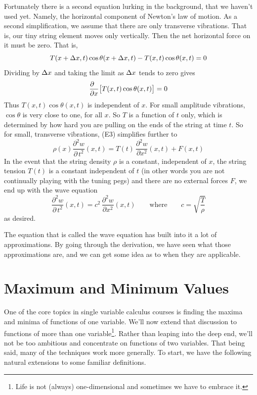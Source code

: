 Fortunately there is a second
equation lurking in the background, that we haven't used yet. Namely, the 
horizontal component of Newton's law of motion. As a second simplification,
we assume that there are only transverse vibrations. That is, our tiny 
string element moves only vertically. Then the net horizontal force on 
it must be zero. That is,
\begin{equation*}
T(x+\Delta x,t)\cos\theta(x+\Delta x,t)-T(x,t)\cos\theta(x,t)=0
\end{equation*}
Dividing by $\Delta x$ and taking the limit as $\Delta x$ tends to zero gives
\begin{equation*}
\frac{\partial \hfill}{\partial x}\big[T(x,t)\cos\theta(x,t)\big]=0
\end{equation*}
Thus $T(x,t)\cos\theta(x,t)$ is independent of $x$.
For small amplitude vibrations, $\cos\theta$ is very close to one, for all
$x$. So $T$ is a function of $t$ only, which is determined by how hard you are
pulling on the ends of the string at time $t$. So for small, transverse
vibrations, (E3) simplifies further to
\begin{equation*}
\rho(x)\frac{\partial^2 w}{\partial\, t^2}(x,t)
=T(t)\,\frac{\partial^2 w}{\partial x^2}(x,t)
+F(x,t)
\tag{E4}\end{equation*}
In the event that the string density $\rho$ is a constant, independent
of $x$, the string tension $T(t)$ is a constant independent of $t$
(in other words you are not continually playing with the tuning pegs)
and there are no external forces $F$, we end up with the wave equation
\begin{equation*}
\frac{\partial^2 w}{\partial\, t^2}(x,t)
=c^2\,\frac{\partial^2 w}{\partial x^2}(x,t)
\qquad
\text{where}\qquad
c=\sqrt{\frac{T}{\rho}}
\end{equation*}
as desired.

The equation that is called the wave equation has built into it a
lot of approximations. By going through the derivation, we have 
seen what those approximations are, and we can get some idea as to when they
are applicable.

\section{Maximum and Minimum Values}\label{sec max}

One of the core topics in single variable calculus courses 
is finding the maxima and minima of functions of one variable.
We'll now extend that discussion to functions of more than one 
variable\footnote{Life is not (always) one-dimensional and sometimes we have to embrace it.}. Rather than leaping into the deep end, we'll not be too 
ambitious and concentrate on functions of two variables. That being said, 
many of the techniques work more generally.
To start, we have the following natural extensions to some familiar
definitions.

